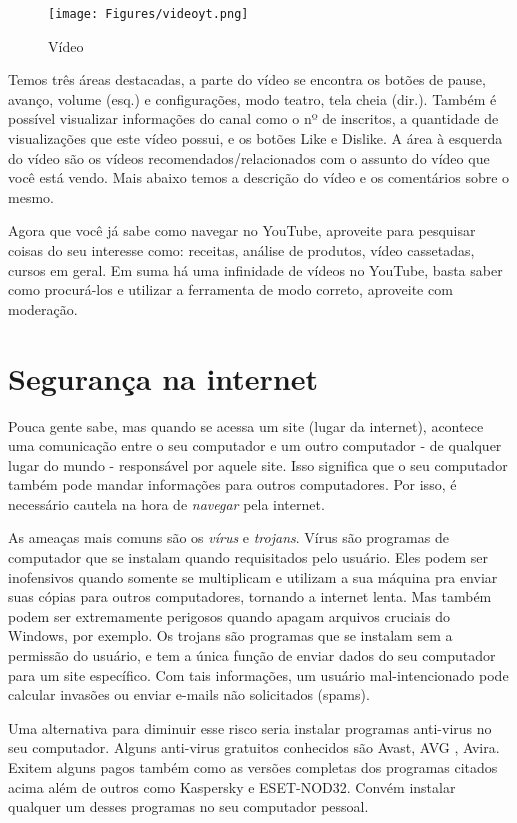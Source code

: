 \documentclass[hidelinks,12pt]{article}
\begin{document}
\begin{figure}[!h]
	\centering
	\texttt{[image: Figures/videoyt.png]}
	\label{fig:config}
	\caption{Vídeo}
\end{figure}

Temos três áreas destacadas, a parte do vídeo se encontra os botões de pause, avanço, volume (esq.) e configurações, modo teatro, tela cheia (dir.).
Também é possível visualizar informações do canal como o nº de inscritos, a quantidade de visualizações que este vídeo possui, e os botões Like e Dislike. A área à esquerda do vídeo são os vídeos recomendados/relacionados com o assunto do vídeo que você está vendo. Mais abaixo temos a descrição do vídeo e os comentários sobre o mesmo.

Agora que você já sabe como navegar no YouTube, aproveite para pesquisar coisas do seu interesse como: receitas, análise de produtos, vídeo cassetadas, cursos em geral. Em suma há uma infinidade de vídeos no YouTube, basta saber como procurá-los e utilizar a ferramenta de modo correto, aproveite com moderação.
	

\section{Segurança na internet}

Pouca gente sabe, mas quando se acessa um site (lugar da internet), acontece uma comunicação entre o seu computador e um outro computador - de qualquer lugar do mundo - responsável por aquele site. Isso significa que o seu computador também pode mandar informações para outros computadores. Por isso, é necessário cautela na hora de \textit{navegar} pela internet.

As ameaças mais comuns são os \textit{vírus} e \textit{trojans}. Vírus são programas de computador que se instalam quando requisitados pelo usuário. Eles podem ser inofensivos quando somente se multiplicam e utilizam a sua máquina pra enviar suas cópias para outros computadores, tornando a internet lenta. Mas também podem ser extremamente perigosos quando apagam arquivos cruciais do Windows, por exemplo. Os trojans são programas que se instalam sem a permissão do usuário, e tem a única função de enviar dados do seu computador para um site específico. Com tais informações, um usuário mal-intencionado pode calcular invasões ou enviar e-mails não solicitados (spams).

Uma alternativa para diminuir esse risco seria instalar programas anti-virus no seu computador. Alguns anti-virus gratuitos conhecidos são Avast, AVG , Avira. Exitem alguns pagos também como as versões completas dos programas citados acima além de outros como Kaspersky e ESET-NOD32. Convém instalar qualquer um desses programas no seu computador pessoal.
\end{document}
